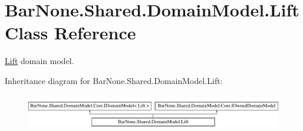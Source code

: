 \hypertarget{class_bar_none_1_1_shared_1_1_domain_model_1_1_lift}{}\section{Bar\+None.\+Shared.\+Domain\+Model.\+Lift Class Reference}
\label{class_bar_none_1_1_shared_1_1_domain_model_1_1_lift}


\mbox{\hyperlink{class_bar_none_1_1_shared_1_1_domain_model_1_1_lift}{Lift}} domain model.  


Inheritance diagram for Bar\+None.\+Shared.\+Domain\+Model.\+Lift\+:\begin{figure}[H]
\begin{center}
\leavevmode
\includegraphics[height=1.586402cm]{class_bar_none_1_1_shared_1_1_domain_model_1_1_lift}
\end{center}
\end{figure}
